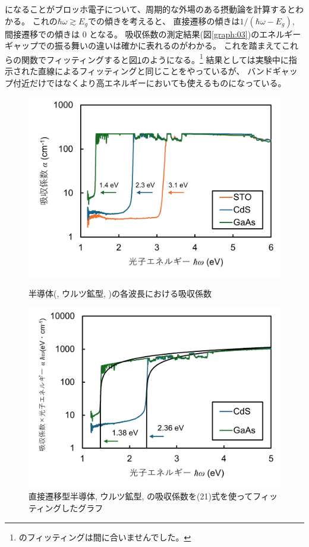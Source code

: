 \documentclass[11pt,dvipdfmx,a4paper]{jsarticle}
\begin{document}
になることがブロッホ電子について、周期的な外場のある摂動論を計算するとわかる\cite{mikoshiba}。
これの\(\hbar\omega \gtrsim E_g\)での傾きを考えると、
直接遷移の傾きは\(1/(\hbar\omega-E_g)\),
間接遷移での傾きは 0 となる。
吸収係数の測定結果(図\ref{graph:03})のエネルギーギャップでの振る舞いの違いは確かに表れるのがわかる。
これを踏まえてこれらの関数でフィッティングすると図\ref{graph:05}のようになる。\footnote{のフィッティングは間に合いませんでした。}
結果としては実験中に指示された直線によるフィッティングと同じことをやっているが、
バンドギャップ付近だけではなくより高エネルギーにおいても使えるものになっている。

\begin{figure}[H]
        \begin{minipage}[t]{0.48\columnwidth}
        \centering
        \includegraphics[width = \columnwidth]{graph/graph3.png}
        \caption{半導体(, ウルツ鉱型, )の各波長における吸収係数}
        \label{graph:03}
    \end{minipage}
    \hfil
    \begin{minipage}[t]{0.48\columnwidth}
        \centering
        \includegraphics[width = \columnwidth]{graph/graph5.png}
        \caption{直接遷移型半導体, ウルツ鉱型, の吸収係数を(21)式を使ってフィッティングしたグラフ}
        \label{graph:05}
    \end{minipage}
\end{figure}
\end{document}

